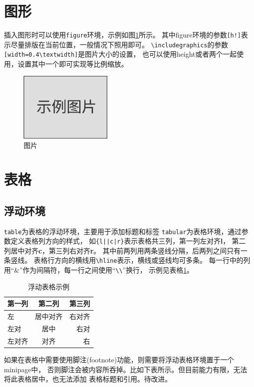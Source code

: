 				\section{图形}
				\label{sec-figure}
				插入图形时可以使用\texttt{figure}环境，示例如图\ref{fig-sample}所示。
				其中figure环境的参数\verb|[h!]|表示尽量排版在当前位置，一般情况下照用即可。
				\verb|\includegraphics|的参数\verb|[width=0.4\textwidth]|是图片大小的设置，
				也可以使用height或者两个一起使用，设置其中一个即可实现等比例缩放。
				\begin{figure}[h!]
					\centering
					\includegraphics[width=0.4\textwidth]{figure/image.pdf}
					\caption{图片}
					\label{fig-sample}
				\end{figure}
				
				\section{表格}
				\label{sec-table}
				
				\subsection{浮动环境}
				\label{subsec-table-float}
				\texttt{table}为表格的浮动环境，主要用于添加标题和标签
				\texttt{tabular}为表格环境，通过参数定义表格列方向的样式，
				如\verb+{l||c|r}+表示表格共三列，第一列左对齐{\bf l}，
				第二列居中对齐{\bf c}，第三列右对齐{\bf r}。
				其中前两列用两条竖线分隔，后两列之间只有一条竖线。
				表格行方向的横线用\verb|\hline|表示，横线或竖线均可多条。
				每一行中的列用“\&”作为间隔符，每一行之间使用“\verb|\\|”换行，
				示例见表格\ref{tab-sample}。
				\begin{table}
					\centering
					\caption{浮动表格示例}
					\label{tab-sample}
					\begin{tabular}{l||c|r}
						\hline
						第一列 & 第二列   & 第三列 \\ \hline \hline
						左     & 居中对齐 & 右对齐 \\ \hline
						左对   & 居中     & 右对   \\ \hline
						左对齐 & 对齐     & 右     \\ \hline
					\end{tabular}
				\end{table}
				如果在表格中需要使用脚注(footnote)功能，则需要将浮动表格环境置于一个minipage中，
				否则脚注会被内容所吞掉。比如下表所示。但目前能力有限，无法将此表格居中，也无法添加
				表格标题和引用。待改进。
				
